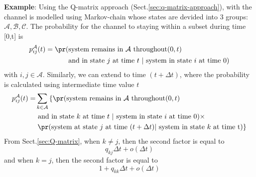 {\bf Example}: Using the Q-matrix approach (Sect.\ref{sec:q-matrix-approach}),
with the channel is modelled using Markov-chain whose states are devided into 3
groups: $\mathcal{A,B,C}$. The probability for the channel to staying within
a subset during time [0,t] is
\begin{equation}
\begin{split}
p_{ij}^{\mathcal{A}}(t) = \pr(&\text{system remains in $\mathcal{A}$ throughout}
(0,t) \\
& \text{and in state $j$ at time $t$ } | \text{ system in state $i$ at time 0})
\end{split}
\end{equation}
with $i,j \in \mathcal{A}$. Similarly, we can extend to time $(t+\Delta t)$,
where the probability is calculated using intermediate time value $t$
\begin{equation}
\begin{split}
p_{ij}^{\mathcal{A}}(t) = & \sum\limits_{k\in \mathcal{A}}
\left\{ \pr(\text{system remains in $\mathcal{A}$ throughout} (0,t) \right.\\
& \text{ and in state $k$ at time $t$ } | \text{ system in state
$i$ at time 0})
\times
\\
& \left. \pr(\text{system at state $j$
at time }(t+\Delta t) | \text{ system in state $k$
at time t})  \right\}
\end{split}
\end{equation}
From Sect.\ref{sec:Q-matrix}, when $k\ne j$, then the second factor is equal to
\begin{equation}
q_{kj} \Delta t+o(\Delta t)
\end{equation}
and when $k=j$, then the second factor is equal to
\begin{equation}
1+q_{kk}\Delta t + o(\Delta t)
\end{equation}

